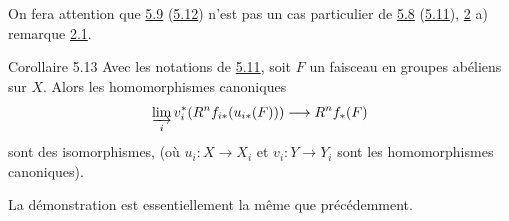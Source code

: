 \documentclass[10pt]{../fichiers-configuration-latex/smfart}
\begin{document}
On fera attention que \hyperref[VII.cor5.9]{5.9} (\resp \hyperref[VII.cor5.12]{5.12}) n'est pas un cas particulier de
\hyperref[VII.cor5.8]{5.8} (\resp \hyperref[VII.cor5.11]{5.11}), \cf \hyperref[VII.sec2]{2} a) remarque \hyperref[VII.rem2.1]{2.1}.

\begin{enonce*}{Corollaire 5.13}
Avec les notations de \hyperref[VII.cor5.11]{5.11}, soit $F$ un faisceau en groupes abéliens
sur $X$. Alors les homomorphismes canoniques
$$
\varinjlim_i v_i^{\ast} (R^n f_{i\ast} (u_{i\ast} (F))) \to
R^n f_{\ast} (F)
$$
sont des isomorphismes, (où $u_i : X \to X_i$ et $v_i : Y \to Y_i$
sont les homomorphismes canoniques).
\end{enonce*}

La démonstration est essentiellement la même que précédemment.
\end{document}
